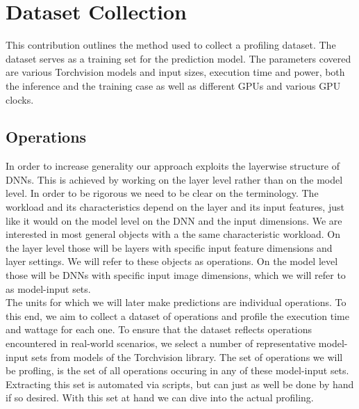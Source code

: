 \chapter{Dataset Collection}\label{chap:contrib1}


This contribution outlines the method used to collect a profiling dataset. The  dataset serves as a training set for the prediction model. The parameters covered are various Torchvision models and input sizes, execution time and power, both the inference and the training case as well as different GPUs and various GPU clocks.


\section{Operations}


In order to increase generality our approach exploits the layerwise structure of DNNs. This is achieved by working on the layer level rather than on the model level. In order to be rigorous we need to be clear on the terminology. The workload and its characteristics depend on the layer and its input features, just like it would on the model level on the DNN and the input dimensions. We are interested in most general objects with a the same characteristic workload. On the layer level those will be layers with specific input feature dimensions and layer settings. We will refer to these objects as operations. On the model level those will be DNNs with specific input image dimensions, which we will refer to as model-input sets. \\
The units for which we will later make predictions are individual operations. To this end, we aim to collect a dataset of operations and profile the execution time and wattage for each one. To ensure that the dataset reflects operations encountered in real-world scenarios, we select a number of representative model-input sets from models of the Torchvision library. The set of operations we will be profling, is the set of all operations occuring in any of these model-input sets. \\
Extracting this set is automated via scripts, but can just as well be done by hand if so desired. With this set at hand we can dive into the actual profiling.


